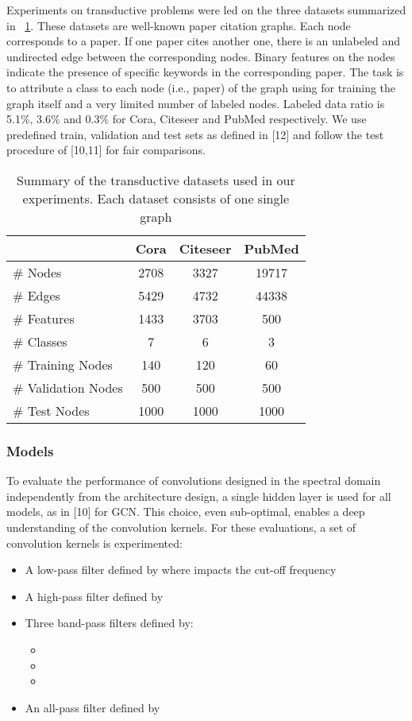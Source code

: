 \documentclass{article}
\begin{document}
Experiments on transductive problems were led on the three datasets summarized in \tablename~\ref{tabletrsum}. These datasets are well-known paper citation graphs. Each node corresponds to a paper. If one paper cites another one, there is an unlabeled and undirected edge between the corresponding nodes. Binary features on the nodes indicate the presence of specific keywords in the corresponding paper. The task is to attribute a class to each node (i.e., paper) of the graph using for training the graph itself and a very limited number of labeled nodes. Labeled data ratio is 5.1\%, 3.6\% and 0.3\% for Cora, Citeseer and PubMed respectively. We use predefined train, validation and test sets as defined in [12] and follow the test procedure of [10,11] for fair comparisons. 

\begin{table}[!t]
\renewcommand{\arraystretch}{1.3}
\caption{Summary of the transductive datasets used in our experiments. \newline Each dataset consists of one single graph}
\centering

\begin{tabular}{l c c c}
  & Cora & Citeseer & PubMed \\
\toprule
\# Nodes  &2708  & 3327   &19717 \\
\# Edges &5429 &4732 &44338 \\
\# Features &1433 &3703 &500 \\
\# Classes &7 &6 &3 \\
\# Training Nodes &140 &120 &60 \\
\# Validation Nodes &500 &500 &500 \\
\# Test Nodes &1000 &1000 &1000 \\
\bottomrule
\end{tabular}
\label{tabletrsum}
\end{table}


\subsubsection{Models} 

To evaluate the performance of convolutions designed in the spectral domain 
independently from the architecture design, a single hidden layer is used for all models, as in [10] for GCN. This choice, even sub-optimal, enables a deep understanding of the convolution kernels. For these evaluations, a set of convolution kernels is experimented:
\begin{itemize}
    \item A low-pass filter defined by  where  impacts the cut-off frequency 
    \item A high-pass filter defined by  
    \item Three band-pass filters defined by: \begin{itemize}
        \item 
        \item 
        \item 
    \end{itemize}
    \item An all-pass filter defined by 
\end{itemize}
\end{document}
